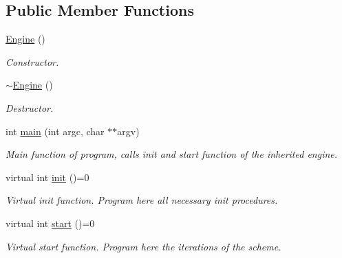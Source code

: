 \subsection*{Public Member Functions}
\begin{DoxyCompactItemize}
\item 
\mbox{\label{classEngine_a8c98683b0a3aa28d8ab72a8bcd0d52f2}} 
\hyperlink{classEngine_a8c98683b0a3aa28d8ab72a8bcd0d52f2}{Engine} ()
\begin{DoxyCompactList}\small\item\em Constructor. \end{DoxyCompactList}\item 
\mbox{\label{classEngine_a8ef7030a089ecb30bbfcb9e43094717a}} 
\hyperlink{classEngine_a8ef7030a089ecb30bbfcb9e43094717a}{$\sim$\+Engine} ()
\begin{DoxyCompactList}\small\item\em Destructor. \end{DoxyCompactList}\item 
\mbox{\label{classEngine_a8464ed1410156a3ccff819373c914297}} 
int \hyperlink{classEngine_a8464ed1410156a3ccff819373c914297}{main} (int argc, char $\ast$$\ast$argv)
\begin{DoxyCompactList}\small\item\em Main function of program, calls init and start function of the inherited engine. \end{DoxyCompactList}\item 
\mbox{\label{classEngine_add639334c809cd3e5c5888899df08e39}} 
virtual int \hyperlink{classEngine_add639334c809cd3e5c5888899df08e39}{init} ()=0
\begin{DoxyCompactList}\small\item\em Virtual init function. Program here all necessary init procedures. \end{DoxyCompactList}\item 
\mbox{\label{classEngine_a133fbaf71f1fb7a2c7eccc9f3482e923}} 
virtual int \hyperlink{classEngine_a133fbaf71f1fb7a2c7eccc9f3482e923}{start} ()=0
\begin{DoxyCompactList}\small\item\em Virtual start function. Program here the iterations of the scheme. \end{DoxyCompactList}\item 
$$
\end{DoxyCompactItemize}
